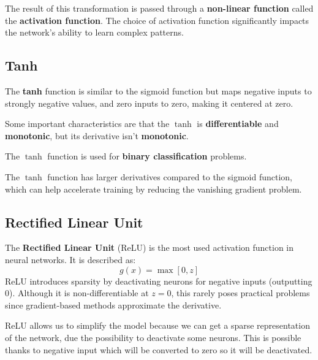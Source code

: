 The result of this transformation is passed through a \textbf{non-linear function}
called the \textbf{activation function}. The choice of activation function
significantly impacts the network's ability to learn complex patterns.

\subsection{Tanh}
The \textbf{tanh} function is similar to the sigmoid function but maps negative
inputs to strongly negative values, and zero inputs to zero, making it centered
at zero.

Some important characteristics are that the $\tanh$ is \textbf{differentiable}
and \textbf{monotonic}, but its derivative isn't \textbf{monotonic}.
\begin{note}
    The $\tanh$ function is used for \textbf{binary classification} problems.
\end{note}

The $\tanh$ function has larger derivatives compared to the sigmoid function,
which can help accelerate training by reducing the vanishing gradient problem.
\subsection{Rectified Linear Unit}
The \textbf{Rectified Linear Unit} (ReLU) is the most used activation function
in neural networks. It is described as:
\begin{equation}
    g(x) = \max[0,z]
\end{equation}
ReLU introduces sparsity by deactivating neurons for negative inputs (outputting
0). Although it is non-differentiable at $z = 0$, this rarely poses practical
problems since gradient-based methods approximate the derivative.

ReLU allows us to simplify the model because we can get a sparse representation
of the network, due the possibility to deactivate some neurons. This is possible
thanks to negative input which will be converted to zero so it will be deactivated.

